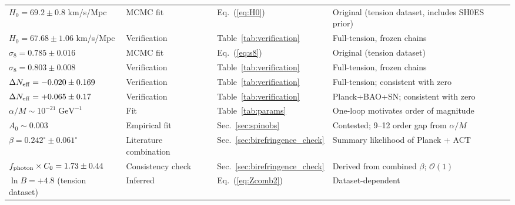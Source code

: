 \documentclass[aps,prd,twocolumn,superscriptaddress,showpacs,preprintnumbers,nofootinbib,longbibliography,floatfix]{revtex4-2}
\newcommand{\Neff}{N_{\rm eff}}
\begin{document}
\begin{table}[t]
\begin{ruledtabular}
\begin{tabular}{llll}
$H_0 = 69.2 \pm 0.8$ km/s/Mpc & MCMC fit & Eq.~(\ref{eq:H0}) & Original (tension dataset, includes SH0ES prior) \\
$H_0 = 67.68 \pm 1.06$ km/s/Mpc & Verification & Table~\ref{tab:verification} & Full-tension, frozen chains \\
$\sigma_8 = 0.785 \pm 0.016$ & MCMC fit & Eq.~(\ref{eq:s8}) & Original (tension dataset) \\
$\sigma_8 = 0.803 \pm 0.008$ & Verification & Table~\ref{tab:verification} & Full-tension, frozen chains \\
$\Delta\Neff = -0.020 \pm 0.169$ & Verification & Table~\ref{tab:verification} & Full-tension; consistent with zero \\
$\Delta\Neff = +0.065 \pm 0.17$ & Verification & Table~\ref{tab:verification} & Planck+BAO+SN; consistent with zero \\
$\alpha/M \sim 10^{-21}\;\text{GeV}^{-1}$ & Fit & Table~\ref{tab:params} & One-loop motivates order of magnitude \\
$A_0 \sim 0.003$ & Empirical fit & Sec.~\ref{sec:spinobs} & Contested; 9--12 order gap from $\alpha/M$ \\
$\beta = 0.242^\circ \pm 0.061^\circ$ & Literature combination & Sec.~\ref{sec:birefringence_check} & Summary likelihood of Planck + ACT \\
$f_{\rm photon} \times C_0 = 1.73 \pm 0.44$ & Consistency check & Sec.~\ref{sec:birefringence_check} & Derived from combined $\beta$; $\mathcal{O}(1)$ \\
$\ln B = +4.8$ (tension dataset) & Inferred & Eq.~(\ref{eq:Zcomb2}) & Dataset-dependent \\
\end{tabular}
\end{ruledtabular}
\end{table}



\end{document}
